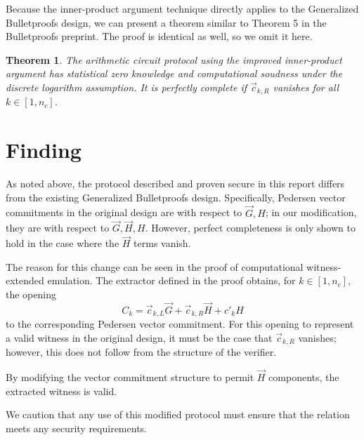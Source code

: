 \documentclass{article}
\newtheorem*{theorem}{Theorem}
\begin{document}
Because the inner-product argument technique directly applies to the Generalized Bulletproofs design, we can present a theorem similar to Theorem 5 in the Bulletproofs preprint.
The proof is identical as well, so we omit it here.

\begin{theorem}
	The arithmetic circuit protocol using the improved inner-product argument has statistical zero knowledge and computational soudness under the discrete logarithm assumption.
	It is perfectly complete if $\vec{c}_{k,R}$ vanishes for all $k \in [1, n_c]$.
\end{theorem}


\section{Finding}

As noted above, the protocol described and proven secure in this report differs from the existing Generalized Bulletproofs design.
Specifically, Pedersen vector commitments in the original design are with respect to $\vec{G}, H$; in our modification, they are with respect to $\vec{G}, \vec{H}, H$.
However, perfect completeness is only shown to hold in the case where the $\vec{H}$ terms vanish.

The reason for this change can be seen in the proof of computational witness-extended emulation.
The extractor defined in the proof obtains, for $k \in [1, n_c]$, the opening
$$C_k = \vec{c}_{k,L} \vec{G} + \vec{c}_{k,R} \vec{H} + c'_k H$$
to the corresponding Pedersen vector commitment.
For this opening to represent a valid witness in the original design, it must be the case that $\vec{c}_{k,R}$ vanishes; however, this does not follow from the structure of the verifier.

By modifying the vector commitment structure to permit $\vec{H}$ components, the extracted witness is valid.

We caution that any use of this modified protocol must ensure that the relation meets any security requirements.




\end{document}
